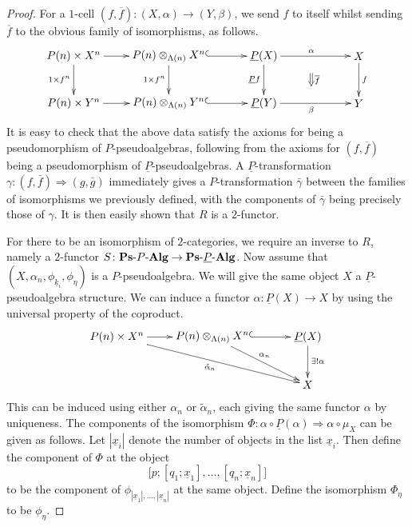 \begin{proof}
For a $1$-cell $(f,\overline{f}) \colon (X, \alpha) \rightarrow (Y, \beta)$, we send $f$ to itself whilst sending $\overline{f}$ to the obvious family of isomorphisms, as follows.
    \[
        \xy
            (-30,0)*+{P(n) \times X^n}="-10";
            (-30,-15)*+{P(n) \times Y^n}="-11";
            (0,0)*+{\coeq{P}{X}{\Lambda}{n}}="00";
            (30,0)*+{\underline{P}(X)}="10";
            (60,0)*+{X}="20";
            (0,-15)*+{\coeq{P}{Y}{\Lambda}{n}}="01";
            (30,-15)*+{\underline{P}(Y)}="11";
            (60,-15)*+{Y}="21";
            {\ar@{^{(}->} "00" ; "10"};
            {\ar^{\alpha} "10" ; "20"};
            {\ar_{1 \times f^n} "00" ; "01"};
            {\ar_{\underline{P}f} "10" ; "11"};
            {\ar^{f} "20" ; "21"};
            {\ar@{^{(}->} "01" ; "11"};
            {\ar_{\beta} "11" ; "21"};
            {\ar "-10" ; "00"};
            {\ar "-11" ; "01"};
            {\ar_{1 \times f^n} "-10" ; "-11"};
            {\ar@{=>}^{\overline{f}} (45,-5.5) ; (45,-9.5)};
        \endxy
    \]
\noindent It is easy to check that the above data satisfy the axioms for being a pseudomorphism of $P$-pseudoalgebras, following from the axioms for $(f,\overline{f})$ being a pseudomorphism of $\underline{P}$-pseudoalgebras. A $\underline{P}$-transformation $\gamma \colon (f, \bar{f}) \Rightarrow (g, \bar{g})$ immediately gives a $P$-transformation $\bar{\gamma}$ between the families of isomorphisms we previously defined, with the components of $\bar{\gamma}$ being precisely those of $\gamma$. It is then easily shown that $R$ is a $2$-functor.

For there to be an isomorphism of $2$-categories, we require an inverse to $R$, namely a $2$-functor $S \colon \mathbf{Ps}\mbox{-}P\mbox{-}\mathbf{Alg} \rightarrow \mathbf{Ps}\mbox{-}\underline{P}\mbox{-}\mathbf{Alg}$. Now assume that $(X, \alpha_n, \phi_{\underline{k}_i}, \phi_\eta)$ is a $P$-pseudoalgebra. We will give the same object $X$ a $\underline{P}$-pseudoalgebra structure. We can induce a functor $\alpha \colon \underline{P}(X) \rightarrow X$ by using the universal property of the coproduct.
    \[
        \xy
            (-30,0)*+{P(n) \times X^n}="-10";
            (0,0)*+{\coeq{P}{X}{\Lambda}{n}}="00";
            (30,0)*+{\underline{P}(X)}="10";
            (30,-15)*+{X}="11";
            {\ar "-10" ; "00"};
            {\ar^{\alpha_n} "00" ; "11"};
            {\ar@{^{(}->} "00" ; "10"};
            {\ar^{\exists ! \alpha} "10" ; "11"};
            {\ar_{\tilde{\alpha}_n} "-10" ; "11"};
        \endxy
    \]
\noindent This can be induced using either $\alpha_n$ or $\tilde{\alpha}_n$, each giving the same functor $\alpha$ by uniqueness. The components of the isomorphism $\Phi \colon \alpha \circ \underline{P}(\alpha) \Rightarrow \alpha \circ \mu_X$ can be given as follows. Let $\left|\underline{x}_i\right|$ denote the number of objects in the list $\underline{x}_i$. Then define the component of $\Phi$ at the object
    \[
        \big[p;\left[q_1;\underline{x}_1\right],\ldots,\left[q_n;\underline{x}_n\right]\big]
    \]
to be the component of $\phi_{\left|\underline{x}_1\right|, \ldots, |\underline{x}_n|}$ at the same object. 
Define the isomorphism $\Phi_{\eta}$ to be $\phi_\eta$.


\end{proof}
